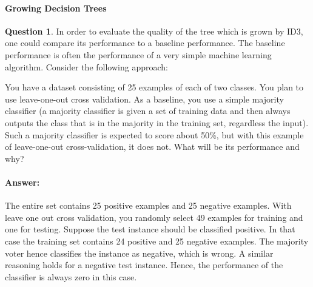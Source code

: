 \documentclass[11pt,a4paper]{article}
\theoremstyle{definition}%
\newtheorem{Q}{Question}[] %
\newcommand{\reponse}[1]{%
\ifthenelse {\boolean{corrige}} {\paragraph{Answer:} \color{darkblue}   #1\color{black}} {}
}
\begin{document}



\paragraph{Growing Decision Trees}
\begin{Q}
In order to evaluate the quality of the tree which is grown by ID3, one could compare its performance
to a baseline performance. The baseline performance is often the performance of a very simple
machine learning algorithm. Consider the following approach:

You have a dataset consisting of 25 examples of each of two classes. You plan to use leave-one-out cross
validation. As a baseline, you use a simple majority classifier (a majority classifier is given a set of
training data and then always outputs the class that is in the majority in the training set, regardless
the input). Such a majority classifier is expected to score about 50\%, but with this example of
leave-one-out cross-validation, it does not. What will be its performance and why?
\reponse{
The entire set contains 25 positive examples and 25 negative examples. With leave one
out cross validation, you randomly select 49 examples for training and one for testing. Suppose the
test instance should be classified positive. In that case the training set contains 24 positive and 25
negative examples. The majority voter hence classifies the instance as negative, which is wrong.
A similar reasoning holds for a negative test instance. Hence, the performance of the classifier is
always zero in this case.
}
\end{Q}
\end{document}
